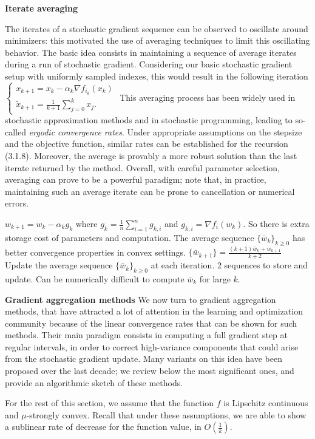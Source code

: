 \documentclass[a4paper,6pt]{extarticle}
\begin{document}
\begin{multicols}{2}
{\textbf{Iterate averaging}

The iterates of a stochastic gradient sequence can be observed to oscillate around minimizers: this motivated the use of averaging techniques to limit this oscillating behavior. The basic idea consists in maintaining a sequence of average iterates during a run of stochastic gradient. Considering our basic stochastic gradient setup with uniformly sampled indexes, this would result in the following iteration
$\begin{cases}
x_{k+1} = x_k - \alpha_k \nabla f_{i_k}(x_k) \\
\tilde{x}_{k+1} = \frac{1}{k+1} \sum_{j=0}^{k} x_j.
\end{cases}
$
This averaging process has been widely used in stochastic approximation methods and in stochastic programming, leading to so-called \textit{ergodic convergence rates}. Under appropriate assumptions on the stepsize and the objective function, similar rates can be established for the recursion (3.1.8). Moreover, the average is provably a more robust solution than the last iterate returned by the method. Overall, with careful parameter selection, averaging can prove to be a powerful paradigm; note that, in practice, maintaining such an average iterate can be prone to cancellation or numerical errors.

$w_{k+1} = w_k - \alpha_k g_k$ where $g_k = \frac{1}{n} \sum_{i=1}^n g_{k, i}$ and $g_{k, i} = \nabla f_i(w_k)$. So there is extra storage cost of parameters and computation. The average sequence $\{ \bar{w}_k \}_{k \geq 0}$ has better convergence properties in convex settings. $\{ \bar{w}_{k+1} \} = \frac{(k+1) \bar{w}_k + w_{k+1}}{k+2}$ Update the average sequence $\{ \bar{w}_k \}_{k \geq 0}$ at each iteration. 2 sequences to store and update. Can be numerically difficult to compute $\bar{w}_k$ for large $k$.

\textbf{Gradient aggregation methods}
We now turn to gradient aggregation methods, that have attracted a lot of attention in the learning and optimization community because of the linear convergence rates that can be shown for such methods. Their main paradigm consists in computing a full gradient step at regular intervals, in order to correct high-variance components that could arise from the stochastic gradient update. Many variants on this idea have been proposed over the last decade; we review below the most significant ones, and provide an algorithmic sketch of these methods.

For the rest of this section, we assume that the function \( f \) is Lipschitz continuous and \(\mu\)-strongly convex. Recall that under these assumptions, we are able to show a sublinear rate of decrease for the function value, in \( O\left(\frac{1}{k}\right) \).

}
\end{multicols}
\end{document}
